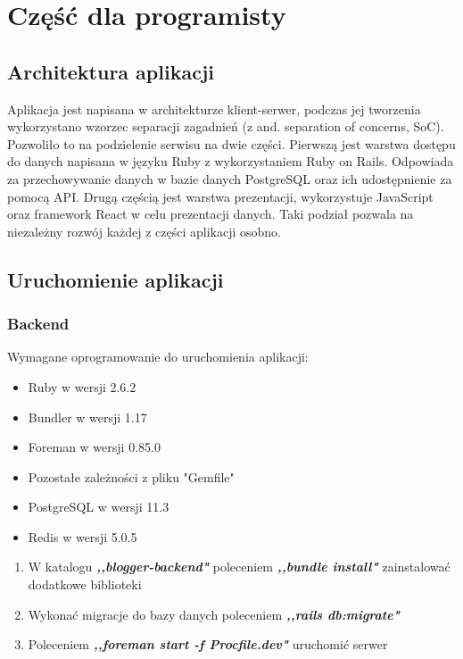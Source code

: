 \documentclass[declaration,shortabstract]{iithesis}
\begin{document}
\chapter{Część dla programisty}
\section{Architektura aplikacji}
Aplikacja jest napisana w architekturze klient-serwer, podczas jej tworzenia wykorzystano wzorzec separacji  zagadnień (z and. separation of concerns, SoC). Pozwoliło to na podzielenie serwisu na dwie części. Pierwszą jest warstwa dostępu do danych napisana w języku Ruby z wykorzystaniem Ruby on Rails. Odpowiada za przechowywanie danych w bazie danych PostgreSQL oraz ich udostępnienie za pomocą API. Drugą częścią jest warstwa prezentacji, wykorzystuje JavaScript oraz framework React w celu prezentacji danych. Taki podział pozwala na niezależny rozwój każdej z części aplikacji osobno.

\section{Uruchomienie aplikacji}

\subsection{Backend}
Wymagane oprogramowanie do uruchomienia aplikacji:
        \begin{itemize}
            \item Ruby w wersji 2.6.2
            \item Bundler w wersji 1.17
            \item Foreman w wersji 0.85.0
            \item Pozostałe zależności z pliku "Gemfile"
            \item PostgreSQL w wersji 11.3
            \item Redis w wersji 5.0.5
        \end{itemize}

\begin{enumerate}
    \item W katalogu \textbf{\textit{,,blogger-backend"}} poleceniem \textbf{\textit{,,bundle install"}} zainstalować dodatkowe biblioteki
    \item Wykonać migracje do bazy danych poleceniem \textbf{\textit{,,rails db:migrate"}}
    \item Poleceniem \textbf{\textit{,,foreman start -f Procfile.dev"}} uruchomić serwer
\end{enumerate}
\end{document}
